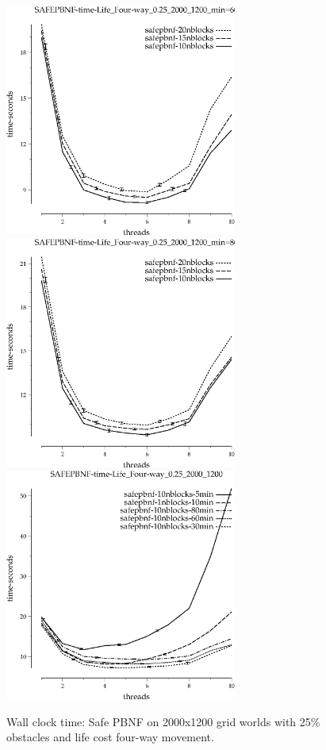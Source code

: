 \documentclass{article}
\begin{document}
\begin{appendices}
\begin{figure}[h]
\begin{center}
\includegraphics[width=3in]{../graphs/grid_life_four-way_0.25_2000_1200/SAFEPBNF-time-Life_Four-way_0.25_2000_1200_min=60.eps}
\includegraphics[width=3in]{../graphs/grid_life_four-way_0.25_2000_1200/SAFEPBNF-time-Life_Four-way_0.25_2000_1200_min=80.eps}
\includegraphics[width=3in]{../graphs/grid_life_four-way_0.25_2000_1200/SAFEPBNF-time-Life_Four-way_0.25_2000_1200.eps}
\caption{Wall clock time: Safe PBNF on 2000x1200 grid worlds with 25\%
  obstacles and life cost four-way movement.}
\end{center}
\end{figure}


\end{appendices}
\end{document}
